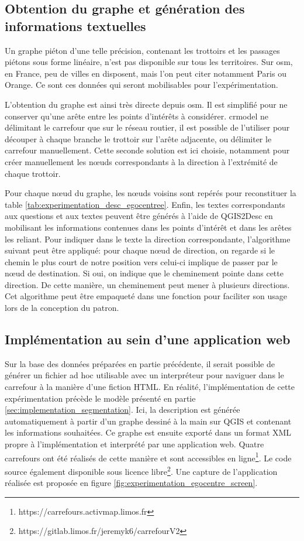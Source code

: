 \subsection{Obtention du graphe et génération des informations textuelles}

Un graphe piéton d'une telle précision, contenant les trottoirs et les passages piétons sous forme linéaire, n'est pas disponible sur tous les territoires. Sur \gls{osm}, en France, peu de villes en disposent, mais l'on peut citer notamment Paris ou Orange. Ce sont ces données qui seront mobilisables pour l'expérimentation. 

\newpar{}

L'obtention du graphe est ainsi très directe depuis \gls{osm}. Il est simplifié pour ne conserver qu'une arête entre les points d'intérêts à considérer. crmodel ne délimitant le carrefour que sur le réseau routier, il est possible de l'utiliser pour découper à chaque branche le trottoir sur l'arête adjacente, ou délimiter le carrefour manuellement. Cette seconde solution est ici choisie, notamment pour créer manuellement les nœuds correspondants à la direction à l'extrémité de chaque trottoir.

\newpar{}

Pour chaque nœud du graphe, les nœuds voisins sont repérés pour reconstituer la table \ref{tab:experimentation_desc_egocentree}. Enfin, les textes correspondants aux questions et aux textes peuvent être générés à l'aide de QGIS2Desc en mobilisant les informations contenues dans les points d'intérêt et dans les arêtes les reliant. Pour indiquer dans le texte la direction correspondante, l'algorithme suivant peut être appliqué: pour chaque nœud de direction, on regarde si le chemin le plus court de notre position vers celui-ci implique de passer par le nœud de destination. Si oui, on indique que le cheminement pointe dans cette direction. De cette manière, un cheminement peut mener à plusieurs directions. Cet algorithme peut être empaqueté dans une fonction pour faciliter son usage lors de la conception du patron.

\subsection{Implémentation au sein d'une application web}

Sur la base des données préparées en partie précédente, il serait possible de générer un fichier ad hoc utilisable avec un interpréteur pour naviguer dans le carrefour à la manière d'une fiction HTML. En réalité, l'implémentation de cette expérimentation précède le modèle présenté en partie \ref{sec:implementation_segmentation}. Ici, la description est générée automatiquement à partir d'un graphe dessiné à la main sur QGIS et contenant les informations souhaitées. Ce graphe est ensuite exporté dans un format XML propre à l'implémentation et interprété par une application web. Quatre carrefours ont été réalisés de cette manière et sont accessibles en ligne\footnote{https://carrefours.activmap.limos.fr}. Le code source également disponible sous licence libre\footnote{https://gitlab.limos.fr/jeremyk6/carrefourV2}. Une capture de l'application réalisée est proposée en figure \ref{fig:experimentation_egocentre_screen}.


